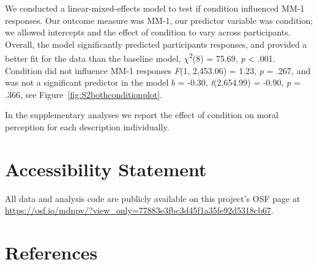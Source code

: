 \documentclass[
  english,
  man,floatsintext]{apa7}
\begin{document}
We conducted a linear-mixed-effects model to test if condition influenced MM-1 responses. Our outcome measure was MM-1, our predictor variable was condition; we allowed intercepts and the effect of condition to vary across participants. Overall, the model significantly predicted participants responses, and provided a better fit for the data than the baseline model, \(\chi\)\textsuperscript{2}(8) = 75.69, \emph{p} \textless{} .001. Condition did not influence MM-1 responses \emph{F}(1, 2,453.06) = 1.23, \emph{p} = .267, and was not a significant predictor in the model \(b\) = -0.30, \emph{t}(2,654.99) = -0.90, \emph{p} = .366, see Figure~\ref{fig:S2bothconditionplot}.

In the supplementary analyses we report the effect of condition on moral perception for each description individually.

\newpage

\hypertarget{accessibility-statement}{%
\section{Accessibility Statement}\label{accessibility-statement}}

All data and analysis code are publicly available on this project's OSF page at \color{blue}\url{https://osf.io/mdnpv/?view_only=77883e3fbc3d45f1a35fe92d5318cb67}\color{black}.

\newpage

\hypertarget{references}{%
\section{References}\label{references}}
\end{document}
